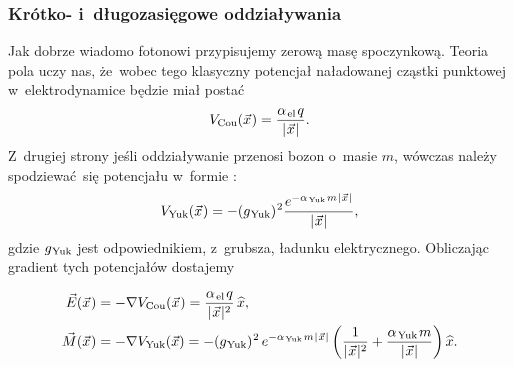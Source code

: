 \documentclass[10pt,t]{beamer}
\begin{document}
\begin{frame}
  \frametitle{Krótko- i~długozasięgowe oddziaływania}


  Jak dobrze wiadomo fotonowi przypisujemy zerową masę spoczynkową.
  Teoria pola uczy nas, że~wobec tego \alert{klasyczny} potencjał
  naładowanej cząstki punktowej w~elektrodynamice będzie miał postać
  \begin{equation}
    \label{eq:Glowne-rodzaje-problemow-podczerwonych-04}
    V_{ \text{Cou} }( \vec{x} \hspace{0.05em} ) =
    \frac{ \alpha_{ \hspace{0.09em} \text{el} } \hspace{0.09em} q }
    { | \hspace{0.05em}  \vec{x}  \hspace{0.05em} | }.
  \end{equation}
  Z~drugiej strony jeśli oddziaływanie przenosi bozon o~masie $m$, wówczas
  należy spodziewać~się potencjału w~formie
  :
  \begin{equation}
    \label{eq:Glowne-rodzaje-problemow-podczerwonych-05}
    V_{ \text{Yuk} }( \vec{x} \hspace{0.05em} ) =
    -( g_{ \hspace{0.05em} \text{Yuk} } )^{ \hspace{0.05em} 2 }
    \frac{ e^{ -\alpha_{ \hspace{0.09em} \text{Yuk} } \hspace{0.09em} m
        \hspace{0.05em} | \hspace{0.05em}  \vec{x}  \hspace{0.05em} | } }
    { | \hspace{0.05em}  \vec{x}  \hspace{0.05em} | },
  \end{equation}
  gdzie $g_{ \hspace{0.05em} \text{Yuk} }$ jest odpowiednikiem, z~grubsza, ładunku
  elektrycznego. Obliczając gradient tych potencjałów dostajemy

  \vspace{-1.8em}


  \begin{subequations}

    \begin{align}
      \label{eq:Glowne-rodzaje-problemow-podczerwonych-06-A}
      \vec{E}( \vec{x} \hspace{0.05em} )
      &= -\nabla V_{ \text{Cou} }( \vec{x} \hspace{0.05em} ) =
        \frac{ \alpha_{ \hspace{0.09em} \text{el} } \hspace{0.09em} q }
        { | \hspace{0.05em}  \vec{x}  \hspace{0.05em} |^{ 2 } } \,
        \widehat{ x }, \\
      \label{eq:Glowne-rodzaje-problemow-podczerwonych-06-B}
      \vec{ M }( \vec{x} \hspace{0.05em} )
      &=
        -\nabla V_{ \text{Yuk} }( \vec{x} ) =
        -( g_{ \hspace{0.05em} \text{Yuk} } )^{ \hspace{0.05em} 2 } \,
        e^{ -\alpha_{ \hspace{0.09em} \text{Yuk} } \hspace{0.09em} m \hspace{0.05em}
        | \hspace{0.05em}  \vec{x}  \hspace{0.05em} | }
        \left( \frac{ 1 }{ | \hspace{0.05em}  \vec{x}  \hspace{0.05em} |^{ 2 } } +
        \frac{ \alpha_{ \hspace{0.09em} \text{Yuk} } \hspace{0.09em} m }
        { | \hspace{0.05em}  \vec{x}  \hspace{0.05em} | } \right)
        \widehat{ x }.
    \end{align}

  \end{subequations}

\end{frame}
\end{document}
